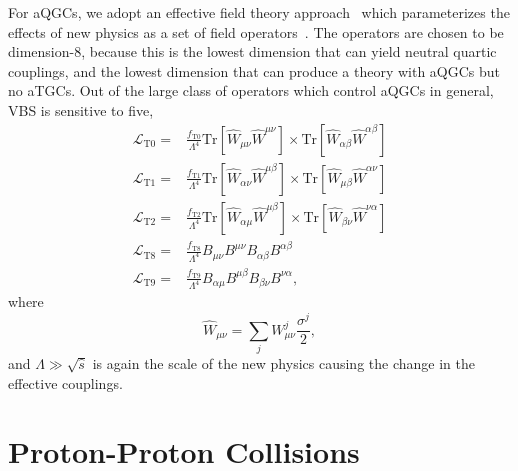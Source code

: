 For aQGCs, we adopt an effective field theory approach~\cite{Degrande:2012wf} which parameterizes the effects of new physics as a set of field operators~\cite{Eboli:2006wa}.
The operators are chosen to be dimension-8, because this is the lowest dimension that can yield neutral quartic couplings, and the lowest dimension that can produce a theory with aQGCs but no aTGCs.
Out of the large class of operators which control aQGCs in general, {\ZZ} VBS is sensitive to five,
\begin{equation}
  \begin{aligned}
    \mathcal{L}_\text{T0} = & \frac{f_\text{T0}}{\Lambda^4} \text{Tr}\left[\hat{W}_{\mu\nu} \hat{W}^{\mu\nu}\right] \times \text{Tr}\left[\hat{W}_{\alpha\beta} \hat{W}^{\alpha\beta}\right] \\
    \mathcal{L}_\text{T1} = & \frac{f_\text{T1}}{\Lambda^4} \text{Tr}\left[\hat{W}_{\alpha\nu} \hat{W}^{\mu\beta}\right] \times \text{Tr}\left[\hat{W}_{\mu\beta} \hat{W}^{\alpha\nu}\right] \\
    \mathcal{L}_\text{T2} = & \frac{f_\text{T2}}{\Lambda^4} \text{Tr}\left[\hat{W}_{\alpha\mu} \hat{W}^{\mu\beta}\right] \times \text{Tr}\left[\hat{W}_{\beta\nu} \hat{W}^{\nu\alpha}\right] \\
    \mathcal{L}_\text{T8} = & \frac{f_\text{T8}}{\Lambda^4} B_{\mu\nu}B^{\mu\nu} B_{\alpha\beta}B^{\alpha\beta} \\
    \mathcal{L}_\text{T9} = & \frac{f_\text{T9}}{\Lambda^4} B_{\alpha\mu}B^{\mu\beta} B_{\beta\nu}B^{\nu\alpha},
  \end{aligned}
\end{equation}
where
\begin{equation}
  \hat{W}_{\mu\nu} = \sum_j W_{\mu\nu}^j \frac{\sigma^j}{2},
\end{equation}
and $\Lambda \gg \sqrt{\hat{s}}$ is again the scale of the new physics causing the change in the effective couplings.



\section{Proton-Proton Collisions}\label{sec:pp}

